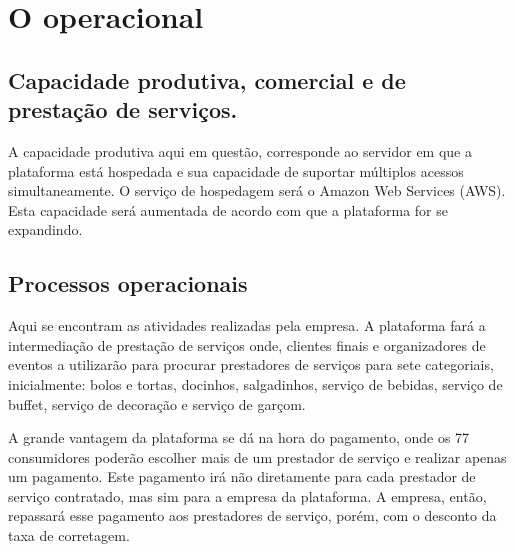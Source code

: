 \section{\textbf{O operacional}}
\label{sec: O operacional}

\begin{commentA}
	
	\par \end{commentA}

\begin{commentB}
	
	\par \end{commentB}

\subsection{Capacidade produtiva, comercial e de prestação de serviços.}
A capacidade produtiva aqui em questão, corresponde ao servidor em que a 
plataforma está hospedada e sua capacidade de suportar múltiplos acessos 
simultaneamente. O serviço de hospedagem será o Amazon Web Services (AWS). 
Esta capacidade será aumentada de acordo com que a plataforma for se expandindo.\par

\subsection{Processos operacionais}
Aqui se encontram as atividades realizadas pela empresa. A plataforma fará a 
intermediação de prestação de serviços onde, clientes finais e organizadores de 
eventos a utilizarão para procurar prestadores de serviços para sete categoriais, 
inicialmente: bolos e tortas, docinhos, salgadinhos, serviço de bebidas, serviço de buffet, serviço de decoração e serviço de garçom.\par

A grande vantagem da plataforma se dá na hora do pagamento, onde os 77
consumidores poderão escolher mais de um prestador de serviço e realizar apenas 
um pagamento. Este pagamento irá não diretamente para cada prestador de serviço 
contratado, mas sim para a empresa da plataforma. A empresa, então, repassará esse pagamento aos prestadores de serviço, porém, com o desconto da taxa de 
corretagem.\par

